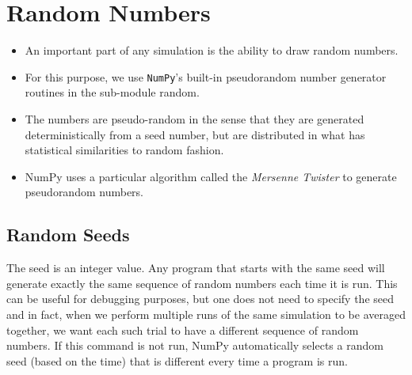 \documentclass[numpymain.tex]{subfiles}
\begin{document}
\section{Random Numbers}



\begin{itemize}
\item An important part of any simulation is the ability to draw random numbers. 
\item For this purpose, 
we use \texttt{NumPy}'s built-in pseudorandom number generator routines in the sub-module 
random. 
\item The numbers are pseudo-random in the sense that they are generated 
deterministically from a seed number, but are distributed in what has statistical similarities to 
random fashion. 
\item NumPy uses a particular algorithm called the \textit{Mersenne Twister} to generate 
pseudorandom numbers. 
\end{itemize}

\subsection{Random Seeds}
The seed is an integer value. Any program that starts with the same seed will generate exactly 
the same sequence of random numbers each time it is run. This can be useful for debugging 
purposes, but one does not need to specify the seed and in fact, when we perform multiple 
runs of the same simulation to be averaged together, we want each such trial to have a 
different sequence of random numbers. If this command is not run, NumPy automatically 
selects a random seed (based on the time) that is different every time a program is run. 
\end{document}
